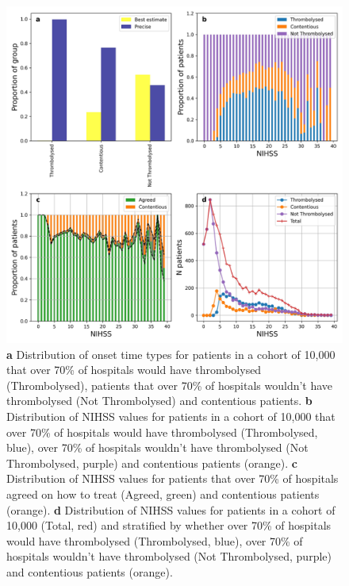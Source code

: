 \documentclass[12pt,a4paper, pdftex]{elsarticle}
\begin{document}
\begin{figure}[h!!!!]
\centering
\includegraphics[width=15cm]{figures/nihss_4.jpg}
\caption{{\bf a} Distribution of onset time types for patients in a cohort of 10,000 that over 70\% of hospitals would have thrombolysed (Thrombolysed), patients that over 70\% of hospitals wouldn't have thrombolysed (Not Thrombolysed) and contentious patients. {\bf b} Distribution of NIHSS values for patients in a cohort of 10,000 that over 70\% of hospitals would have thrombolysed (Thrombolysed, blue), over 70\% of hospitals wouldn't have thrombolysed (Not Thrombolysed, purple) and contentious patients (orange). {\bf c} Distribution of NIHSS values for patients that over 70\% of hospitals agreed on how to treat (Agreed, green) and contentious patients (orange). {\bf d} Distribution of NIHSS values for patients in a cohort of 10,000 (Total, red) and stratified by whether over 70\% of hospitals would have thrombolysed (Thrombolysed, blue),  over 70\% of hospitals wouldn't have thrombolysed (Not Thrombolysed, purple) and contentious patients (orange).}
\label{fig:nihss_4}
\end{figure}
\end{document}
